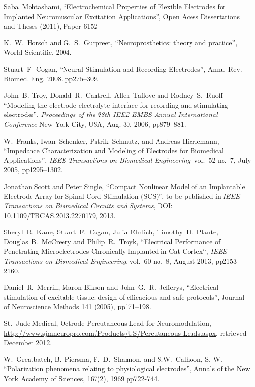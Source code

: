 \documentclass[journal, a4paper]{IEEEtran}
\begin{document}
\begin{thebibliography}{99}

    Saba~Mohtashami,
    ``Electrochemical Properties of Flexible Electrodes for Implanted Neuromuscular Excitation Applications'',
    Open Acess Dissertations and Theses (2011), Paper 6152

    K.~W.~Horsch and G.~S.~Gurpreet,
    ``Neuroprosthetics: theory and practice'',
    World Scientific, 2004.

    Stuart~F.~Cogan,
    ``Neural Stimulation and Recording Electrodes'',
    Annu. Rev. Biomed. Eng. 2008. pp275--309.

    John~B.~Troy, Donald~R.~Cantrell, Allen~Taflove and Rodney~S.~Ruoff
    ``Modeling the electrode-electrolyte interface for recording and stimulating electrodes'',
    {\em Proceedings of the 28th IEEE EMBS Annual International Conference}
    New York City, USA, Aug. 30, 2006, pp879--881.

W.~Franks, Iwan~Schenker, Patrik~Schmutz, and Andreas Hierlemann,
``Impedance Characterization and Modeling of Electrodes for Biomedical Applications'',
\emph{IEEE Transactions on Biomedical Engineering},
vol.~52 no.~7, July 2005, pp1295--1302.

Jonathan Scott and Peter Single,
``Compact Nonlinear Model of an Implantable Electrode Array for Spinal Cord Stimulation (SCS)'',
to be published in
{\em IEEE Transactions on Biomedical Circuits and Systems},
DOI: 10.1109/TBCAS.2013.2270179, 2013.

Sheryl~R.~Kane, Stuart~F.~Cogan, Julia~Ehrlich, Timothy~D.~Plante, Douglas~B.~McCreery and Philip~R.~Troyk,
``Electrical Performance of Penetrating Microelectrodes Chronically Implanted in Cat Cortex``,
{\em IEEE Transactions on Biomedical Engineering},
vol.~60 no.~8, August 2013, pp2153--2160.

Daniel~R.~Merrill, Maron Bikson and John~G.~R.\ Jefferys,
``Electrical stimulation of excitable tissue: design of efficacious and safe protocols'',
Journal of Neuroscience Methods 141 (2005), pp171--198.

St.~Jude Medical, Octrode Percutaneous Lead for Neuromodulation,
\url{http://www.sjmneuropro.com/Products/US/Percutaneous-Leads.aspx},
retrieved December 2012.

W.~Greatbatch, B.~Piersma, F.~D.~Shannon, and S.W.~Calhoon, S. W.
``Polarization phenomena relating to physiological electrodes'',
Annals of the New York Academy of Sciences,
167(2), 1969 pp722-744.


\end{thebibliography}
\end{document}
